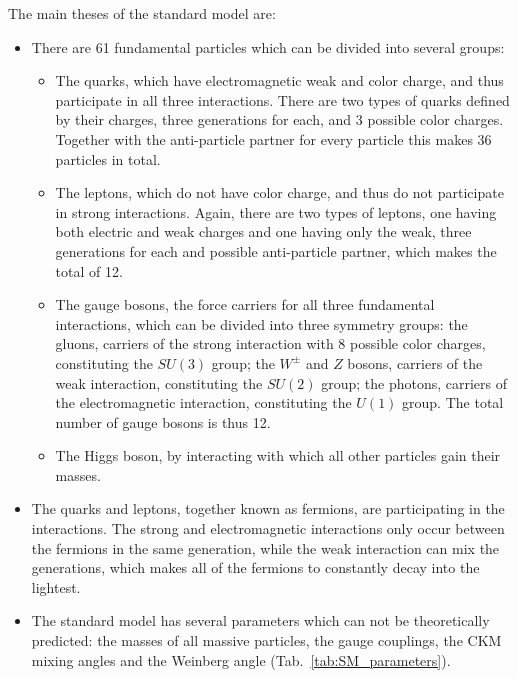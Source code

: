 The main theses of the standard model are:
\begin{itemize}
\item There are 61 fundamental particles which can be divided into several groups:
\begin{itemize}
\item The quarks, which have electromagnetic weak and color charge, and thus participate in all three interactions. There are two types of quarks defined by their charges, three generations for each, and 3 possible color charges. Together with the anti-particle partner for every particle this makes 36 particles in total.
\item The leptons, which do not have color charge, and thus do not participate in strong interactions. Again, there are two types of leptons, one having both electric and weak charges and one having only the weak, three generations for each and possible anti-particle partner, which makes the total of 12.
\item The gauge bosons, the force carriers for all three fundamental interactions, which can be divided into three symmetry groups: the gluons, carriers of the strong interaction with 8 possible color charges, constituting the $SU(3)$ group; the $W^{\pm}$ and $Z$ bosons, carriers of the weak interaction, constituting the $SU(2)$ group; the photons, carriers of the electromagnetic interaction, constituting the $U(1)$ group. The total number of gauge bosons is thus 12.
\item The Higgs boson, by interacting with which all other particles gain their masses.
\end{itemize}
\item The quarks and leptons, together known as fermions, are participating in the interactions. The strong and electromagnetic interactions only occur between the fermions in the same generation, while the weak interaction can mix the generations, which makes all of the fermions to constantly decay into the lightest.
\item The standard model has several parameters which can not be theoretically predicted: the masses of all massive particles, the gauge couplings, the CKM mixing angles and the Weinberg angle (Tab.~\ref{tab:SM_parameters}).
\end{itemize}

